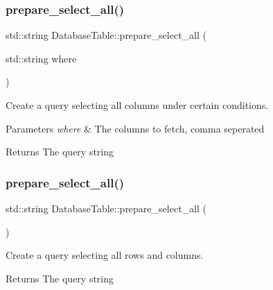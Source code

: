 \subsubsection{\texorpdfstring{prepare\+\_\+select\+\_\+all()}{prepare\_select\_all()}\hspace{0.1cm}{\footnotesize\ttfamily [1/2]}}
{\footnotesize\ttfamily std\+::string Database\+Table\+::prepare\+\_\+select\+\_\+all (\begin{DoxyParamCaption}\item[{std\+::string}]{where }\end{DoxyParamCaption})}



Create a query selecting all columns under certain conditions. 


\begin{DoxyParams}{Parameters}
{\em where} & The columns to fetch, comma seperated \\
\hline
\end{DoxyParams}
\begin{DoxyReturn}{Returns}
The query string 
\end{DoxyReturn}
\mbox{\label{class_database_table_ade634681afae1d6dec558c049eb907a9}} 
\subsubsection{\texorpdfstring{prepare\+\_\+select\+\_\+all()}{prepare\_select\_all()}\hspace{0.1cm}{\footnotesize\ttfamily [2/2]}}
{\footnotesize\ttfamily std\+::string Database\+Table\+::prepare\+\_\+select\+\_\+all (\begin{DoxyParamCaption}{ }\end{DoxyParamCaption})}



Create a query selecting all rows and columns. 

\begin{DoxyReturn}{Returns}
The query string 
\end{DoxyReturn}
\mbox{\label{class_database_table_aa975049890361cdee6d04ddf497e6c07}} 
